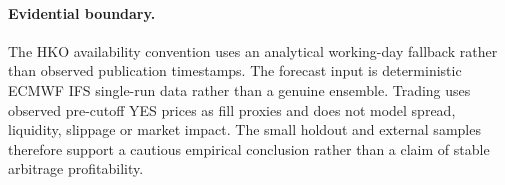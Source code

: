 \paragraph{Evidential boundary.}
The HKO availability convention uses an analytical working-day fallback rather than observed publication timestamps. The forecast input is deterministic ECMWF IFS single-run data rather than a genuine ensemble. Trading uses observed pre-cutoff YES prices as fill proxies and does not model spread, liquidity, slippage or market impact. The small holdout and external samples therefore support a cautious empirical conclusion rather than a claim of stable arbitrage profitability.
